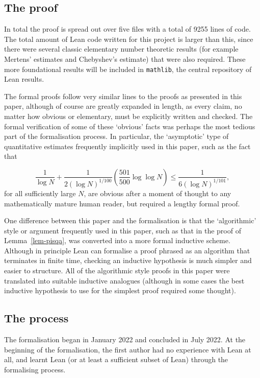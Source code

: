 \documentclass[12pt]{amsart}
\newcommand{\brac}[1]{\left( #1\right)}
\begin{document}
\subsection{The proof}

In total the proof is spread out over five files with a total of 9255 lines of code. The total amount of Lean code written for this project is larger than this, since there were several classic elementary number theoretic results (for example Mertens' estimates and Chebyshev's estimate) that were also required. These more foundational results will be included in \texttt{mathlib}, the central repository of Lean results. 

The formal proofs follow very similar lines to the proofs as presented in this paper, although of course are greatly expanded in length, as every claim, no matter how obvious or elementary, must be explicitly written and checked. The formal verification of some of these `obvious' facts was perhaps the most tedious part of the formalisation process. In particular, the `asymptotic' type of quantitative estimates frequently implicitly used in this paper, such as the fact that 

\[\frac{1}{\log N}+\frac{1}{2(\log N)^{1/100}}\brac{\frac{501}{500}\log\log N}\leq \frac{1}{6(\log N)^{1/101}},\]
for all sufficiently large $N$, are obvious after a moment of thought to any mathematically mature human reader, but required a lengthy formal proof.

One difference between this paper and the formalisation is that the `algorithmic' style or argument frequently used in this paper, such as that in the proof of Lemma~\ref{lem-pisqa}, was converted into a more formal inductive scheme. Although in principle Lean can formalise a proof phrased as an algorithm that terminates in finite time, checking an inductive hypothesis is much simpler and easier to structure. All of the algorithmic style proofs in this paper were translated into suitable inductive analogues (although in some cases the best inductive hypothesis to use for the simplest proof required some thought).
\subsection{The process}

The formalisation began in January 2022 and concluded in July 2022. At the beginning of the formalisation, the first author had no experience with Lean at all, and learnt Lean (or at least a sufficient subset of Lean) through the formalising process. 
\end{document}
